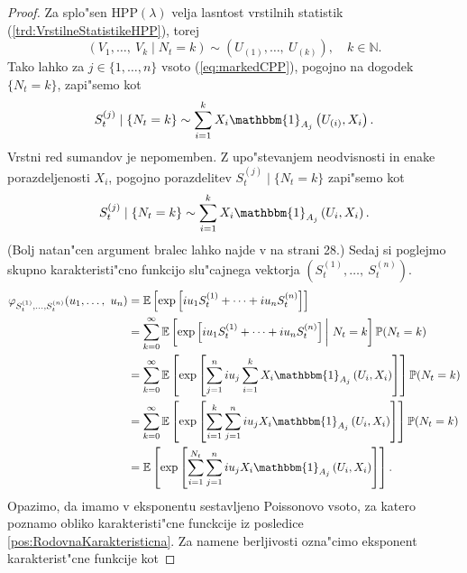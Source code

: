\documentclass[12pt, a4paper, reqno]{amsart}
\theoremstyle{definition}
\theoremstyle{plain}
\newcommand{\N}{\mathbb{N}}
\newcommand{\E}{\mathbb{E}}
\newcommand{\Prob}{\mathbb{P}}
\newcommand{\1}{\mathds{1}}
\begin{document}
        \begin{proof}
            Za splo"sen $\text{HPP}(\lambda)$ velja lasntost vrstilnih statistik (\ref{trd:VrstilneStatistikeHPP}),
            torej
            \begin{equation*}
                \left(V_1, \dots, \ V_k \mid N_t = k\right)\sim \left(U_{(1)}, \dots, \ U_{(k)}\right), \quad k\in\N.
            \end{equation*}
            Tako lahko za $j\in\{1, \dots, n\}$ vsoto (\ref{eq:markedCPP}), pogojno na dogodek $\{N_t = k\}$, zapi"semo kot
            \begin{equation*}
                S_t^{(j)}\mid \{N_t = k\} \sim \sum_{i=1}^{k}X_i\mathbbm{1}_{A_j}\left(U_{(i)}, X_i\right).
            \end{equation*}
            Vrstni red sumandov je nepomemben. Z upo"stevanjem neodvisnosti in enake 
            porazdeljenosti $X_i$, pogojno porazdelitev $S_t^{(j)}\mid \{N_t = k\} $ zapi"semo kot 
            \begin{equation*}
                S_t^{(j)}\mid \{N_t = k\} \sim \sum_{i=1}^{k}X_i\mathbbm{1}_{A_j}\left(U_{i}, X_i\right).
            \end{equation*}
            (Bolj natan"cen argument bralec lahko najde v \cite{4} na strani 28.)
            Sedaj si poglejmo skupno karakteristi"cno funkcijo slu"cajnega vektorja
            $(S_t^{(1)}, \dots, \ S_t^{(n)})$.
            \begin{align*}
                \varphi_{S_t^{(1)},\dots, S_t^{(n)}}(u_1, \dots, \ u_n) 
                    &= \E\left[\exp\left[iu_1S_t^{(1)} + \dots + iu_nS_t^{(n)}\right]\right] \\
                    &= \sum_{k =0}^\infty \E\left[\exp\left[iu_1S_t^{(1)} + \dots + iu_nS_t^{(n)}\right]\bigg| \ N_t = k\right]\Prob(N_t = k)\\
                    &= \sum_{k=0}^\infty \E\left[\exp\left[\sum_{j=1}^niu_j\sum_{i=1}^kX_i\mathbbm{1}_{A_j}\left(U_i, X_i\right)\right]\right]\Prob(N_t = k)\\
                    &= \sum_{k=0}^\infty \E\left[\exp\left[\sum_{i=1}^k\sum_{j=1}^niu_jX_i\mathbbm{1}_{A_j}\left(U_i, X_i\right)\right]\right]\Prob(N_t = k)\\
                    &= \E\left[\exp\left[\sum_{i=1}^{N_t}\sum_{j=1}^niu_jX_i\mathbbm{1}_{A_j}\left(U_i, X_i\right)\right]\right]. 
            \end{align*}
            Opazimo, da imamo v eksponentu sestavljeno Poissonovo vsoto, za katero poznamo obliko karakteristi"cne 
            funckcije iz posledice \ref{pos:RodovnaKarakteristicna}. Za namene berljivosti ozna"cimo 
            eksponent karakterist"cne funkcije kot


\end{proof}
\end{document}
